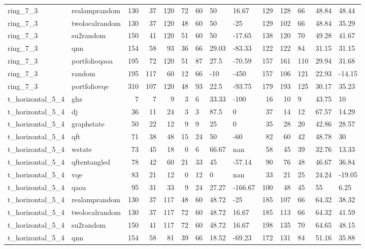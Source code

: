 \begin{longtable}{llrrrrlllrrlll}
ring\_7\_3 & realamprandom & 130 & 37 & 120 & 72 & 60 & 50 & 16.67 & 129 & 128 & 66 & 48.84 & 48.44 \\
ring\_7\_3 & twolocalrandom & 130 & 37 & 120 & 48 & 60 & 50 & -25 & 129 & 102 & 66 & 48.84 & 35.29 \\
ring\_7\_3 & su2random & 150 & 41 & 120 & 51 & 60 & 50 & -17.65 & 138 & 120 & 70 & 49.28 & 41.67 \\
ring\_7\_3 & qnn & 154 & 58 & 93 & 36 & 66 & 29.03 & -83.33 & 122 & 122 & 84 & 31.15 & 31.15 \\
ring\_7\_3 & portfolioqaoa & 195 & 72 & 120 & 51 & 87 & 27.5 & -70.59 & 157 & 161 & 110 & 29.94 & 31.68 \\
ring\_7\_3 & random & 195 & 117 & 60 & 12 & 66 & -10 & -450 & 157 & 106 & 121 & 22.93 & -14.15 \\
ring\_7\_3 & portfoliovqe & 310 & 107 & 120 & 48 & 93 & 22.5 & -93.75 & 179 & 193 & 125 & 30.17 & 35.23 \\
t\_horizontal\_5\_4 & ghz & 7 & 7 & 9 & 3 & 6 & 33.33 & -100 & 16 & 10 & 9 & 43.75 & 10 \\
t\_horizontal\_5\_4 & dj & 36 & 11 & 24 & 3 & 3 & 87.5 & 0 & 37 & 14 & 12 & 67.57 & 14.29 \\
t\_horizontal\_5\_4 & graphstate & 50 & 22 & 12 & 9 & 9 & 25 & 0 & 35 & 28 & 20 & 42.86 & 28.57 \\
t\_horizontal\_5\_4 & qft & 71 & 38 & 48 & 15 & 24 & 50 & -60 & 82 & 60 & 42 & 48.78 & 30 \\
t\_horizontal\_5\_4 & wstate & 73 & 45 & 18 & 0 & 6 & 66.67 & nan & 58 & 45 & 39 & 32.76 & 13.33 \\
t\_horizontal\_5\_4 & qftentangled & 78 & 42 & 60 & 21 & 33 & 45 & -57.14 & 90 & 76 & 48 & 46.67 & 36.84 \\
t\_horizontal\_5\_4 & vqe & 83 & 21 & 12 & 0 & 12 & 0 & nan & 33 & 21 & 25 & 24.24 & -19.05 \\
t\_horizontal\_5\_4 & qaoa & 95 & 31 & 33 & 9 & 24 & 27.27 & -166.67 & 100 & 48 & 45 & 55 & 6.25 \\
t\_horizontal\_5\_4 & realamprandom & 130 & 37 & 117 & 48 & 60 & 48.72 & -25 & 185 & 107 & 66 & 64.32 & 38.32 \\
t\_horizontal\_5\_4 & twolocalrandom & 130 & 37 & 117 & 72 & 60 & 48.72 & 16.67 & 185 & 113 & 66 & 64.32 & 41.59 \\
t\_horizontal\_5\_4 & su2random & 150 & 41 & 117 & 72 & 60 & 48.72 & 16.67 & 198 & 135 & 70 & 64.65 & 48.15 \\
t\_horizontal\_5\_4 & qnn & 154 & 58 & 81 & 39 & 66 & 18.52 & -69.23 & 172 & 131 & 84 & 51.16 & 35.88 \\

\end{longtable}
